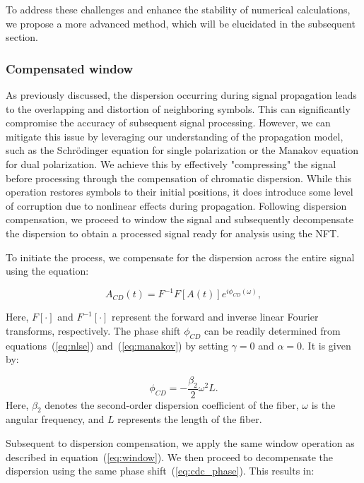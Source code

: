 To address these challenges and enhance the stability of numerical calculations, we propose a more advanced method, which will be elucidated in the subsequent section.

\subsubsection{Compensated window}

As previously discussed, the dispersion occurring during signal propagation leads to the overlapping and distortion of neighboring symbols. This can significantly compromise the accuracy of subsequent signal processing. However, we can mitigate this issue by leveraging our understanding of the propagation model, such as the Schr\"odinger equation for single polarization or the Manakov equation for dual polarization. We achieve this by effectively "compressing" the signal before processing through the compensation of chromatic dispersion. While this operation restores symbols to their initial positions, it does introduce some level of corruption due to nonlinear effects during propagation. Following dispersion compensation, we proceed to window the signal and subsequently decompensate the dispersion to obtain a processed signal ready for analysis using the NFT.

To initiate the process, we compensate for the dispersion across the entire signal using the equation:

\begin{equation}
A_{CD}(t) = F^{-1}F[A(t)]e^{i\phi_{CD}(\omega)} {,}
\end{equation}

Here, $F[\cdot]$ and $F^{-1}[\cdot]$ represent the forward and inverse linear Fourier transforms, respectively. The phase shift $\phi_{CD}$ can be readily determined from equations~(\ref{eq:nlse}) and~(\ref{eq:manakov}) by setting $\gamma = 0$ and $\alpha = 0$. It is given by:

\begin{equation}
\phi_{CD} = -\frac{\beta_2}{2} \omega^2 L {.}
\label{eq:cdc_phase}
\end{equation}
%
Here, $\beta_2$ denotes the second-order dispersion coefficient of the fiber, $\omega$ is the angular frequency, and $L$ represents the length of the fiber.

Subsequent to dispersion compensation, we apply the same window operation as described in equation~(\ref{eq:window}). We then proceed to decompensate the dispersion using the same phase shift~(\ref{eq:cdc_phase}). This results in:

